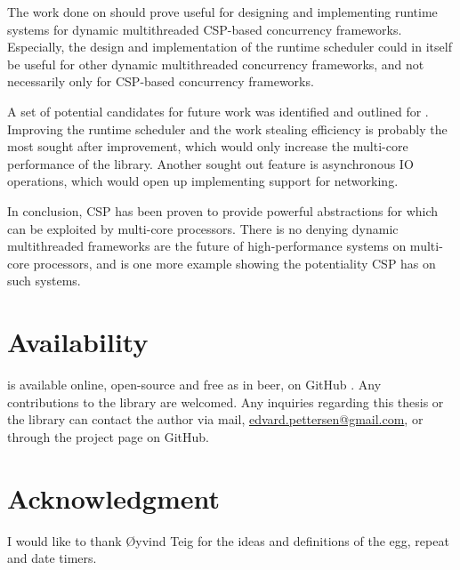 The work done on \Proxc{} should prove useful for designing and implementing runtime systems for dynamic multithreaded CSP\hyp{}based concurrency frameworks. Especially, the design and implementation of the runtime scheduler could in itself be useful for other dynamic multithreaded concurrency frameworks, and not necessarily only for CSP\hyp{}based concurrency frameworks.

A set of potential candidates for future work was identified and outlined for \Proxc{}. Improving the runtime scheduler and the work stealing efficiency is probably the most sought after improvement, which would only increase the multi\hyp{}core performance of the library. Another sought out feature is asynchronous IO operations, which would open up implementing support for networking.

In conclusion, CSP has been proven to provide powerful abstractions for which can be exploited by multi\hyp{}core processors. There is no denying dynamic multithreaded frameworks are the future of high\hyp{}performance systems on multi\hyp{}core processors, and \Proxc{} is one more example showing the potentiality CSP has on such systems.


\section{Availability}


\Proxc{} is available online, open\hyp{}source and free as in beer, on GitHub \citep{pettersen2017proxcgithub}. Any contributions to the library are welcomed. Any inquiries regarding this thesis or the library can contact the author via mail, \href{mailto:edvard.pettersen@gmail.com}{edvard.pettersen@gmail.com}, or through the project page on GitHub.


\section{Acknowledgment}


I would like to thank Øyvind Teig for the ideas and definitions of the egg, repeat and date timers.

